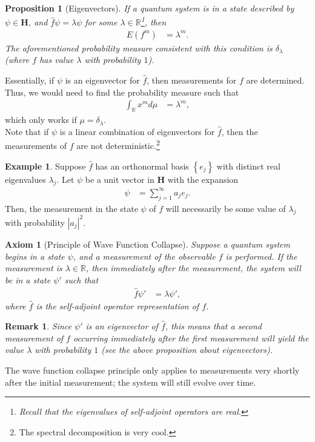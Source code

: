 \documentclass[10pt]{extarticle}
\newtheorem*{remark}{Remark}
\newcommand{\R}{\mathbb{R}}
\newcommand{\set}[1]{\left\{#1\right\}}
\theoremstyle{plain}
\newtheorem*{axiom}{Axiom}%
\newtheorem*{proposition}{Proposition}%
\theoremstyle{definition}
\newtheorem*{example}{Example}
\theoremstyle{remark}
\begin{document}
  \begin{proposition}[Eigenvectors]
    If a quantum system is in a state described by $\psi\in \mathbf{H}$, and $\hat{f}\psi = \lambda\psi$ for some $\lambda\in \R$\footnote{Recall that the eigenvalues of self-adjoint operators are real.}, then
    \begin{align*}
      E(f^{m}) &= \lambda^{m}.
    \end{align*}
    The aforementioned probability measure consistent with this condition is $\delta_{\lambda}$ (where $f$ has value $\lambda$ with probability $1$).
  \end{proposition}
  Essentially, if $\psi$ is an eigenvector for $\hat{f}$, then measurements for $f$ are determined. Thus, we would need to find the probability measure such that
  \begin{align*}
    \int_{\R}x^{m}d\mu &= \lambda^{m},
  \end{align*}
  which only works if $\mu = \delta_{\lambda}$.\\

  Note that if $\psi$ is a linear combination of eigenvectors for $\hat{f}$, then the measurements of $f$ are not deterministic.\footnote{The spectral decomposition is very cool.}
  \begin{example}
    Suppose $\hat{f}$ has an orthonormal basis $\set{e_j}$ with distinct real eigenvalues $\lambda_j$. Let $\psi$ be a unit vector in $\mathbf{H}$ with the expansion
    \begin{align*}
      \psi &= \sum_{j=1}^{\infty}a_je_j.
    \end{align*}
    Then, the measurement in the state $\psi$ of $f$ will necessarily be some value of $\lambda_j$ with probability $|a_j|^2$.
  \end{example}
  \begin{axiom}[Principle of Wave Function Collapse]
    Suppose a quantum system begins in a state $\psi$, and a measurement of the observable $f$ is performed. If the measurement is $\lambda \in \R$, then immediately after the measurement, the system will be in a state $\psi'$ such that
    \begin{align*}
      \hat{f}\psi' &= \lambda \psi',
    \end{align*}
    where $\hat{f}$ is the self-adjoint operator representation of $f$.
  \end{axiom}
  \begin{remark}
    Since $\psi'$ is an eigenvector of $\hat{f}$, this means that a second measurement of $f$ occurring immediately after the first measurement will yield the value $\lambda$ with probability $1$ (see the above proposition about eigenvectors).
  \end{remark}
  The wave function collapse principle only applies to measurements very shortly after the initial measurement; the system will still evolve over time.
\end{document}
